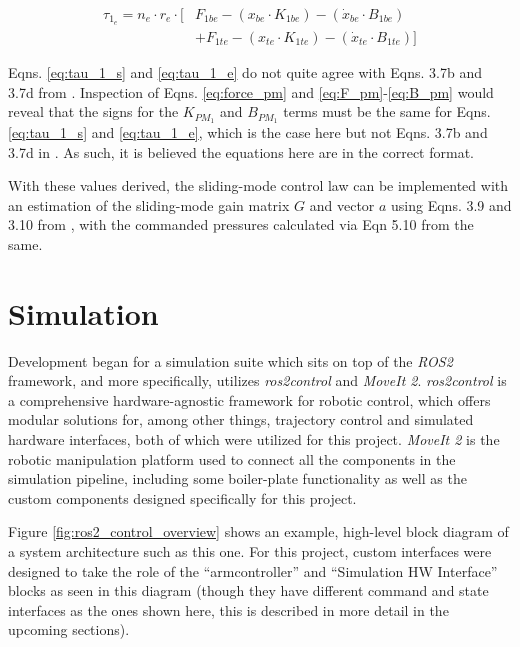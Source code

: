 \documentclass[conference]{IEEEtran}
\begin{document}
	\begin{equation}\label{eq:tau_1_e}
		\begin{aligned}
			\tau_{1_{e}} = n_{e} \cdot r_{e} \cdot \lbrack & F_{1be} - (x_{be} \cdot K_{1be}) - (\dot{x}_{be} \cdot B_{1be})\\
			&+ F_{1te} - (x_{te} \cdot K_{1te}) - (\dot{x}_{te} \cdot B_{1te}) \rbrack
		\end{aligned}
	\end{equation}

	Eqns. \eqref{eq:tau_1_s} and \eqref{eq:tau_1_e} do not quite agree with Eqns. 3.7b and 3.7d from \cite{main-article}. Inspection of Eqns. \eqref{eq:force_pm} and \eqref{eq:F_pm}-\eqref{eq:B_pm} would reveal that the signs for the $K_{PM_{1}}$ and $B_{PM_{1}}$ terms must be the same for Eqns. \eqref{eq:tau_1_s} and \eqref{eq:tau_1_e}, which is the case here but not Eqns. 3.7b and 3.7d in \cite{main-article}. As such, it is believed the equations here are in the correct format.

	With these values derived, the sliding-mode control law can be implemented with an estimation of the sliding-mode gain matrix $G$ and vector $a$ using Eqns. 3.9 and 3.10 from \cite{main-article}, with the commanded pressures calculated via Eqn 5.10 from the same.

	\section{Simulation}

	Development began for a simulation suite which sits on top of the \textit{ROS2} framework, and more specifically, utilizes \textit{ros2\textunderscore control} and \textit{MoveIt 2}. \textit{ros2\textunderscore control} is a comprehensive hardware-agnostic framework for robotic control, which offers modular solutions for, among other things, trajectory control and simulated hardware interfaces, both of which were utilized for this project. \textit{MoveIt 2} is the robotic manipulation platform used to connect all the components in the simulation pipeline, including some boiler-plate functionality as well as the custom components designed specifically for this project.

	Figure \ref{fig:ros2_control_overview} shows an example, high-level block diagram of a system architecture such as this one. For this project, custom interfaces were designed to take the role of the ``arm\textunderscore controller'' and ``Simulation HW Interface'' blocks as seen in this diagram (though they have different command and state interfaces as the ones shown here, this is described in more detail in the upcoming sections).
\end{document}
